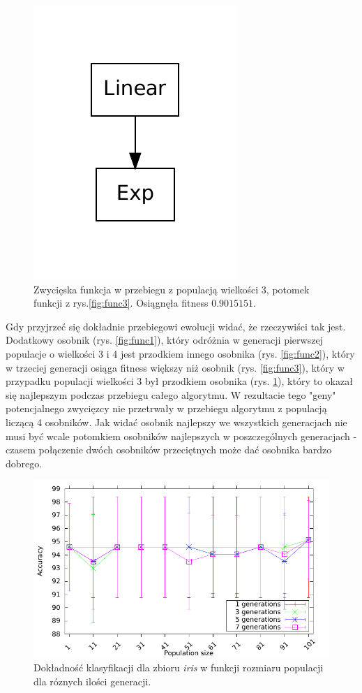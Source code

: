 \documentclass{article}
\begin{document}
    	\begin{figure}[H]
		\includegraphics[scale=0.60]{figures/functions/func4}
		\caption{Zwycięska funkcja w przebiegu z populacją wielkości 3, potomek funkcji z rys.\ref{fig:func3}. Osiągnęła fitness $0.9015151$. \label{fig:func4}}
	\end{figure} 	
	
	 Gdy przyjrzeć się dokładnie przebiegowi ewolucji widać, że rzeczywiści tak jest. Dodatkowy osobnik (rys. \ref{fig:func1}), który odróżnia w generacji pierwszej populacje o wielkości 3 i 4 jest przodkiem innego osobnika (rys. \ref{fig:func2}), który w trzeciej generacji osiąga fitness większy niż osobnik (rys. \ref{fig:func3}), który w przypadku populacji wielkości 3 był przodkiem osobnika (rys. \ref{fig:func4}), który to okazał się najlepszym podczas przebiegu całego algorytmu. W rezultacie tego "geny" potencjalnego zwycięzcy nie przetrwały w przebiegu algorytmu z populacją liczącą 4 osobników. Jak widać osobnik najlepszy we wszystkich generacjach nie musi być wcale potomkiem osobników najlepszych w poszczególnych generacjach - czasem połączenie dwóch osobników przeciętnych może dać osobnika bardzo dobrego. 	
	
	\begin{figure}[ht]
		\includegraphics[scale=0.90]{figures/accuracy-iris}
		\caption{Dokładność klasyfikacji dla zbioru \emph{iris} w funkcji rozmiaru populacji dla róznych ilości generacji.\label{fig:acc-iris}}
	\end{figure}
	
\end{document}

